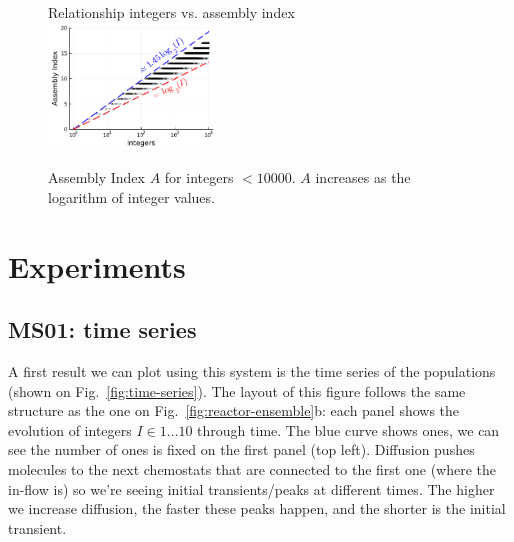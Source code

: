\documentclass[11pt]{book}
\begin{document}
\begin{figure}[hbt]
  \centering
  {\LARGE Relationship integers vs. assembly index}\vspace{1em}\\
  \includegraphics[width=0.40\textwidth]{figures/system/integers-assembly.pdf}
  \caption{Assembly Index $A$ for integers $<10000$. $A$ increases as the logarithm of integer values.}
  \label{fig:integers-assembly}
\end{figure}

\chapter{Experiments}

\section{MS01: time series}

A first result we can plot using this system is the time series of the populations (shown on Fig.~\ref{fig:time-series}). The layout of this figure follows the same structure as the one on Fig.~\ref{fig:reactor-ensemble}b: each panel shows the evolution of integers $I\in{1...10}$ through time. The blue curve shows ones, we can see the number of ones is fixed on the first panel (top left). Diffusion pushes molecules to the next chemostats that are connected to the first one (where the in-flow is) so we’re seeing initial transients/peaks at different times. The higher we increase diffusion, the faster these peaks happen, and the shorter is the initial transient.
\end{document}

